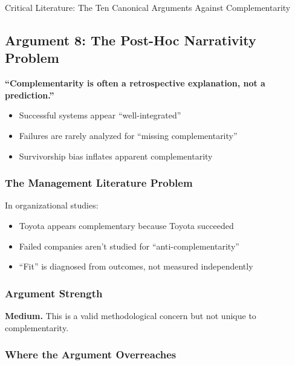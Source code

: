 \begin{chapter}{Critical Literature: The Ten Canonical Arguments Against Complementarity}
\subsection{Argument 8: The Post-Hoc Narrativity Problem}
\label{sec:arg-posthoc}

\begin{tcolorbox}[colback=red!5!white,colframe=red!75!black,title=\textbf{Core Claim}]
\textbf{``Complementarity is often a retrospective explanation, not a prediction.''}

\begin{itemize}[noitemsep]
    \item Successful systems appear ``well-integrated''
    \item Failures are rarely analyzed for ``missing complementarity''
    \item Survivorship bias inflates apparent complementarity
\end{itemize}
\end{tcolorbox}

\subsubsection{The Management Literature Problem}

In organizational studies:
\begin{itemize}[noitemsep]
    \item Toyota appears complementary because Toyota succeeded
    \item Failed companies aren't studied for ``anti-complementarity''
    \item ``Fit'' is diagnosed from outcomes, not measured independently
\end{itemize}

\subsubsection{Argument Strength}

\textbf{Medium.} This is a valid methodological concern but not unique to complementarity.

\subsubsection{Where the Argument Overreaches}


\end{chapter}
